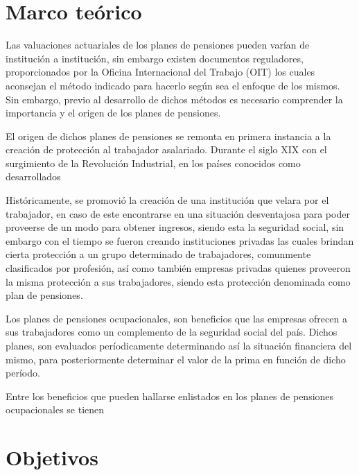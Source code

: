 \documentclass[12pt,letterpaper,titlepage]{article}
\begin{document}
\section{Marco teórico}

Las valuaciones actuariales de los planes de pensiones pueden varían de institución  a institución, sin embargo existen documentos reguladores, proporcionados por la Oficina Internacional del Trabajo (OIT) los cuales aconsejan el método indicado para hacerlo según sea el enfoque de los mismos. Sin embargo, previo al desarrollo de dichos métodos es necesario comprender la importancia y el origen de los planes de pensiones. 

El origen de dichos planes de pensiones se remonta en primera instancia a la creación de protección al trabajador asalariado. Durante el siglo XIX con el surgimiento de la Revolución Industrial, en los países conocidos como desarrollados 

Históricamente, se promovió la creación de una institución que velara por el trabajador, en caso de este encontrarse en una situación desventajosa para poder proveerse de un modo para obtener ingresos, siendo esta la seguridad social, sin embargo con el tiempo se fueron creando instituciones privadas las cuales brindan cierta protección a un grupo determinado de trabajadores, comunmente clasificados por profesión, así como también empresas privadas quienes proveeron la misma protección a sus trabajadores,  siendo esta protección denominada como plan de pensiones.

Los planes de pensiones ocupacionales, son beneficios que las empresas ofrecen a sus trabajadores como un complemento de la seguridad social del país. Dichos planes, son evaluados períodicamente determinando así la situación financiera del mismo, para posteriormente determinar el valor de la prima en función de dicho período. 

Entre los beneficios que pueden hallarse enlistados en los planes de pensiones ocupacionales se tienen



\newpage

\section{Objetivos}
\end{document}
